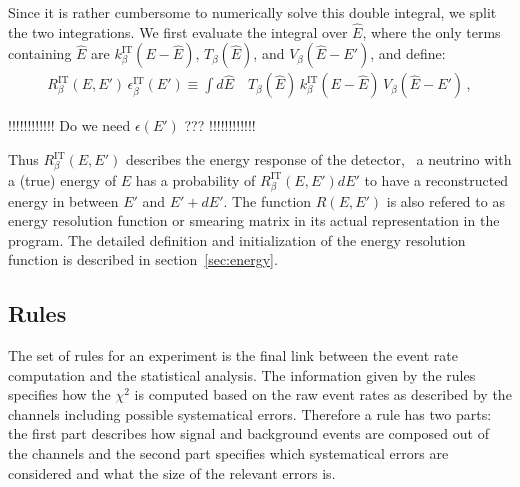Since it is rather cumbersome to numerically solve this double integral,
we split the two integrations. We first evaluate the integral over
$\hat{E}$, where the only terms containing $\hat{E}$ are
$k_\beta^{\text{IT}}(E-\hat{E})$,  $ T_\beta(\hat{E})$, and 
$ V_\beta(\hat{E}-E')$, and define:
\begin{eqnarray}
\label{eq:e_res} 
R_\beta^{\text{IT}}(E,E')\,\epsilon_\beta^{\text{IT}}(E')
 \equiv
\int d\hat{E} \quad T_\beta(\hat{E})\,k_\beta^{\text{IT}}(E-\hat{E})
\,V_\beta(\hat{E}-E')\,, 
\end{eqnarray}

!!!!!!!!!!!!
Do we need $\epsilon(E')$ ???
!!!!!!!!!!!!

Thus $R_\beta^{\text{IT}}(E,E')$ describes the energy response of 
the detector, \ie\ a neutrino with a (true) energy of $E$ has a probability
of $R_\beta^{\text{IT}}(E,E') dE'$ to have a reconstructed energy 
in between $E'$ and $E'+dE'$. The function $R(E,E')$ is also refered to
as energy resolution function or smearing matrix in its actual representation
in the program. The detailed
definition and initialization of the energy resolution function is described
in section~\ref{sec:energy}.

\subsection{Rules}
\label{sec:rules}

The set of rules for an experiment is the final 
link between the event rate
computation and the statistical analysis. The information given by the rules
specifies how the $\chi^2$ is computed based on the raw event rates as 
described by the channels including possible systematical errors. 
Therefore a rule has two parts: the first part describes how signal and 
background events are composed out of the channels and the second part
specifies which systematical errors are considered and what the size
of the relevant errors is.

